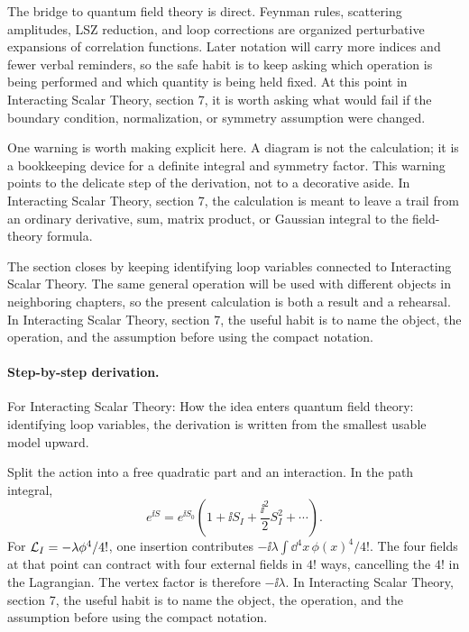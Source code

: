 The bridge to quantum field theory is direct.  Feynman rules, scattering amplitudes, LSZ reduction, and loop corrections are organized perturbative expansions of correlation functions.  Later notation will carry more indices and fewer verbal reminders, so the safe habit is to keep asking which operation is being performed and which quantity is being held fixed.  At this point in Interacting Scalar Theory, section 7, it is worth asking what would fail if the boundary condition, normalization, or symmetry assumption were changed.

One warning is worth making explicit here.  A diagram is not the calculation; it is a bookkeeping device for a definite integral and symmetry factor.  This warning points to the delicate step of the derivation, not to a decorative aside.  In Interacting Scalar Theory, section 7, the calculation is meant to leave a trail from an ordinary derivative, sum, matrix product, or Gaussian integral to the field-theory formula.

The section closes by keeping identifying loop variables connected to Interacting Scalar Theory.  The same general operation will be used with different objects in neighboring chapters, so the present calculation is both a result and a rehearsal.  In Interacting Scalar Theory, section 7, the useful habit is to name the object, the operation, and the assumption before using the compact notation.



\paragraph{Step-by-step derivation.}

For Interacting Scalar Theory: How the idea enters quantum field theory: identifying loop variables, the derivation is written from the smallest usable model upward.

Split the action into a free quadratic part and an interaction.  In the path integral,
\[
  e^{\ii S}=e^{\ii S_0}\left(1+\ii S_I+\frac{\ii^2}{2}S_I^2+\cdots\right).
\]
For \(\mathcal L_I=-\lambda\phi^4/4!\), one insertion contributes \(-\ii\lambda\int\dd^4x\,\phi(x)^4/4!\).  The four fields at that point can contract with four external fields in \(4!\) ways, cancelling the \(4!\) in the Lagrangian.  The vertex factor is therefore \(-\ii\lambda\).  In Interacting Scalar Theory, section 7, the useful habit is to name the object, the operation, and the assumption before using the compact notation.


